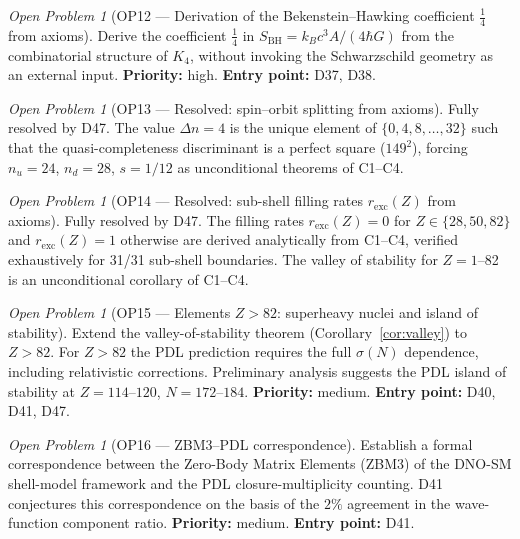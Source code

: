 \documentclass[11pt,a4paper]{article}
\theoremstyle{plain}
\theoremstyle{definition}
\theoremstyle{remark}
\newtheorem{openproblem}[theorem]{Open Problem}
\newcommand{\sigmaN}{\sigma(N)}
\newcommand{\SBH}{S_{\mathrm{BH}}}
\begin{document}
\begin{openproblem}[OP12 --- Derivation of the Bekenstein--Hawking coefficient $\tfrac{1}{4}$ from axioms]
\label{op:BHcoeff}
Derive the coefficient $\tfrac{1}{4}$ in $\SBH=k_Bc^3A/(4\hbar G)$ from the combinatorial structure of $K_4$, without invoking the Schwarzschild geometry as an external input. \textbf{Priority:} high. \textbf{Entry point:} D37, D38.
\end{openproblem}

\begin{openproblem}[OP13 --- Resolved: spin--orbit splitting from axioms]
\label{op:spinorbit}
\textcolor{proofblue}{Fully resolved by D47.} The value $\Delta n = 4$ is the unique element of $\{0,4,8,\ldots,32\}$ such that the quasi-completeness discriminant is a perfect square ($149^2$), forcing $n_u=24$, $n_d=28$, $s=1/12$ as unconditional theorems of C1--C4.
\end{openproblem}

\begin{openproblem}[OP14 --- Resolved: sub-shell filling rates $r_{\mathrm{exc}}(Z)$ from axioms]
\label{op:filling}
\textcolor{proofblue}{Fully resolved by D47.} The filling rates $r_{\mathrm{exc}}(Z) = 0$ for $Z \in \{28,50,82\}$ and $r_{\mathrm{exc}}(Z) = 1$ otherwise are derived analytically from C1--C4, verified exhaustively for 31/31 sub-shell boundaries. The valley of stability for $Z=1$--82 is an unconditional corollary of C1--C4.
\end{openproblem}

\begin{openproblem}[OP15 --- Elements $Z>82$: superheavy nuclei and island of stability]
\label{op:superheavy}
Extend the valley-of-stability theorem (Corollary~\ref{cor:valley}) to $Z>82$. For $Z>82$ the PDL prediction requires the full $\sigmaN$ dependence, including relativistic corrections. Preliminary analysis suggests the PDL island of stability at $Z=114$--$120$, $N=172$--$184$. \textbf{Priority:} medium. \textbf{Entry point:} D40, D41, D47.
\end{openproblem}

\begin{openproblem}[OP16 --- ZBM3--PDL correspondence]
\label{op:ZBM3}
Establish a formal correspondence between the Zero-Body Matrix Elements (ZBM3) of the DNO-SM shell-model framework and the PDL closure-multiplicity counting. D41 conjectures this correspondence on the basis of the $2\%$ agreement in the wave-function component ratio. \textbf{Priority:} medium. \textbf{Entry point:} D41.
\end{openproblem}
\end{document}
